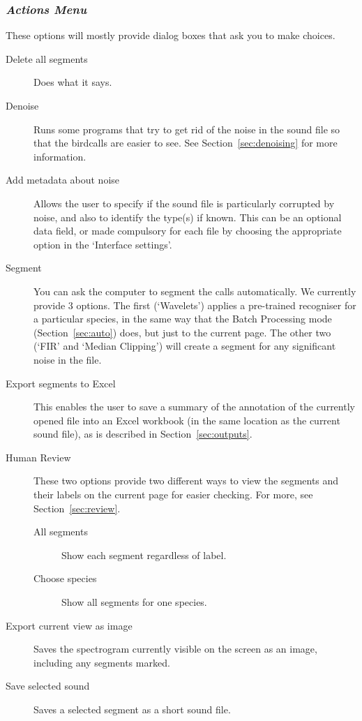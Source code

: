 \documentclass{article}
\begin{document}
\subsubsection{{\em Actions Menu}}
\label{sec:action}

These options will mostly provide dialog boxes that ask you to make choices. 

\begin{description}
\item [Delete all segments] Does what it says. 
\item [Denoise] Runs some programs that try to get rid of the noise in the sound file so that the birdcalls are easier to see. %
See Section~\ref{sec:denoising} for more information.
\item [Add metadata about noise] Allows the user to specify if the sound file is particularly corrupted by noise, and also to identify the type(s) if known. This can be an optional data field, or made compulsory for each file by choosing the appropriate option in the `Interface settings'.
\item [Segment] You can ask the computer to segment the calls automatically. We currently provide 3 options. The first (`Wavelets') applies a pre-trained recogniser for a particular species, in the same way that the Batch Processing mode (Section~\ref{sec:auto}) does, but just to the current page. The other two (`FIR' and `Median Clipping') will create a segment for any significant noise in the file. 
\item [Export segments to Excel] This enables the user to save a summary of the annotation of the currently opened file into an Excel workbook (in the same location as the current sound file), as is described in Section~\ref{sec:outputs}. 
\item [Human Review] These two options provide two different ways to view the segments and their labels on the current page for easier checking. For more, see Section~\ref{sec:review}.
\begin{description}
\item[All segments] Show each segment regardless of label.
\item[Choose species] Show all segments for one species.
\end{description}
\item [Export current view as image] Saves the spectrogram currently visible on the screen as an image, including any segments marked. 
\item [Save selected sound] Saves a selected segment as a short sound file.
\end{description}
\end{document}
